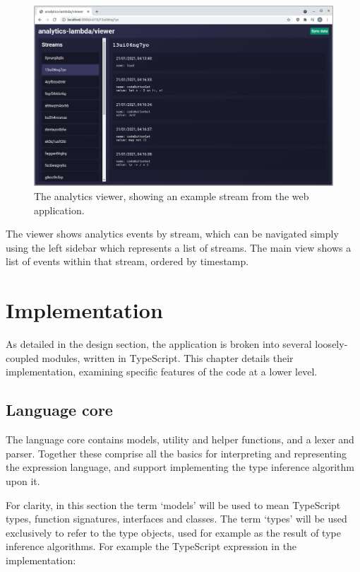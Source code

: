 \documentclass[a4paper,fleqn,oneside,12pt]{report}
\begin{document}
\begin{figure}[h!]
  \centering
  \includegraphics[width=1.000\linewidth]{images/image16.png}
  \caption{The analytics viewer, showing an example stream from the web application.}
\end{figure}

The viewer shows analytics events by stream, which can be navigated simply using the left sidebar which represents a list of streams. The main view shows a list of events within that stream, ordered by timestamp.
\chapter{Implementation}\label{id:h.igepudpadp49}
As detailed in the design section, the application is broken into several loosely-coupled modules, written in TypeScript. This chapter details their implementation, examining specific features of the code at a lower level.

\section{Language core}\label{id:h.o3ngfa303saw}
The language core contains models, utility and helper functions, and a lexer and parser. Together these comprise all the basics for interpreting and representing the expression language, and support implementing the type inference algorithm upon it.

For clarity, in this section the term ‘models’ will be used to mean TypeScript types, function signatures, interfaces and classes. The term ‘types’ will be used exclusively to refer to the type objects, used for example as the result of type inference algorithms. For example the TypeScript expression in the implementation:
\end{document}

